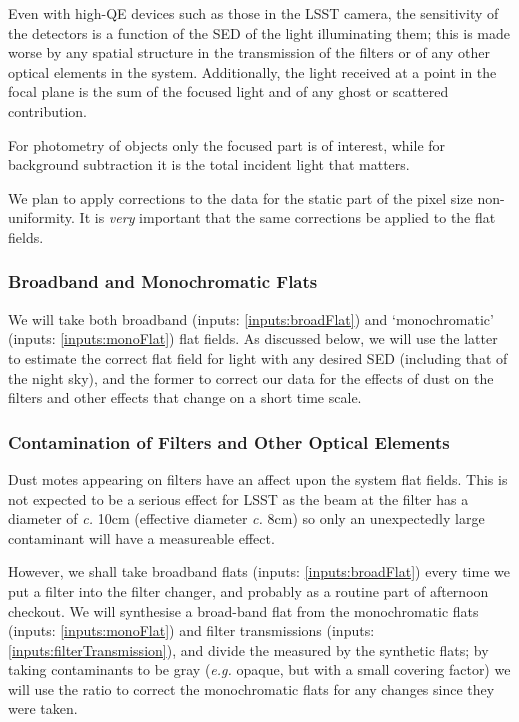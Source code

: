 \documentclass[12pt]{article}
\renewcommand{\c}{\textit{c.}\xspace}
\newcommand{\eg}{\textit{e.g.}\xspace}
\newcommand{\inputData}[1]{(inputs: \ref{inputs:#1})}
\begin{document}
Even with high-QE devices such as those in the LSST camera, the sensitivity of the detectors is a function of
the SED of the light illuminating them; this is made worse by any spatial structure in the transmission of the
filters or of any other optical elements in the system.  Additionally, the light received at a point in the
focal plane is the sum of the focused light and of any ghost or scattered contribution.

For photometry of objects only the focused part is of interest, while for background subtraction it is the
total incident light that matters.

We plan to apply corrections to the data for the static part of the pixel size non-uniformity.  It is
\textit{very} important that the same corrections be applied to the flat fields.

\subsubsection{Broadband and Monochromatic Flats}

We will take both broadband \inputData{broadFlat} and `monochromatic' \inputData{monoFlat} flat fields.  As
discussed below, we will use the latter to estimate the correct flat field for light with any desired SED
(including that of the night sky), and the former to correct our data for the effects of dust on the filters
and other effects that change on a short time scale.

\subsubsection{Contamination of Filters and Other Optical Elements}

Dust motes appearing on filters have an affect upon the system flat fields.  This is not expected to be
a serious effect for LSST as the beam at the filter has a diameter of \c 10cm (effective diameter \c 8cm)
so only an unexpectedly large contaminant will have a measureable effect.

However, we shall take broadband flats \inputData{broadFlat} every time we put a filter into the filter
changer, and probably as a routine part of afternoon checkout.  We will synthesise a broad-band flat from the
monochromatic flats \inputData{monoFlat} and filter transmissions \inputData{filterTransmission}, and divide the
measured by the synthetic flats; by taking contaminants to be gray (\eg opaque, but with a small covering
factor) we will use the ratio to correct the monochromatic flats for any changes since they were taken.
\end{document}
